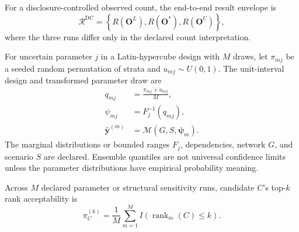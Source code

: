 For a disclosure-controlled observed count, the end-to-end result envelope is
\begin{equation}
\mathcal{R}^{\mathrm{DC}}
=\left\{R(\mathbf O^{L}),R(\mathbf O^{*}),R(\mathbf O^{U})\right\},
\label{eq:confidentiality-envelope}
\end{equation}
where the three runs differ only in the declared count interpretation.

For uncertain parameter $j$ in a Latin-hypercube design with $M$ draws, let
$\pi_{mj}$ be a seeded random permutation of strata and $u_{mj}\sim U(0,1)$.
The unit-interval design and transformed parameter draw are
\begin{align}
q_{mj}
 &=\frac{\pi_{mj}+u_{mj}}{M},
\label{eq:lhs-stratum}\\
\psi_{mj}
 &=F_j^{-1}(q_{mj}),
\label{eq:lhs-transform}\\
\widehat{\mathbf y}^{(m)}
 &=\mathcal{M}\!\left(G,S,\boldsymbol\psi_m\right).
\label{eq:parameter-ensemble}
\end{align}
The marginal distributions or bounded ranges $F_j$, dependencies, network $G$,
and scenario $S$ are declared. Ensemble quantiles are not universal confidence
limits unless the parameter distributions have empirical probability meaning.

Across $M$ declared parameter or structural sensitivity runs, candidate $C$'s
top-$k$ rank acceptability is
\begin{equation}
\pi_C^{(k)}
=\frac{1}{M}\sum_{m=1}^{M}I\!\left(\operatorname{rank}_m(C)\le k\right).
\label{eq:rank-acceptability}
\end{equation}
